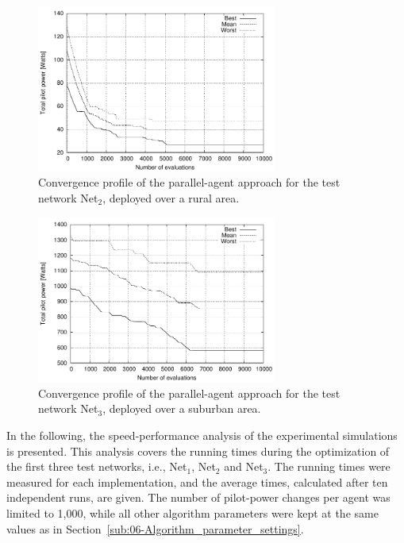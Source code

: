 \begin{figure}[h]
\centering

\includegraphics[width=0.7\textwidth]{06-experimental_evaluation-service_coverage/img/convergence_second}

\caption{Convergence profile of the parallel-agent approach for the test network
Net$_{2}$, deployed over a rural area.\emph{\label{fig:06-Convergence_Net2}}}
\end{figure}


\begin{figure}[h]
\centering

\includegraphics[width=0.7\textwidth]{06-experimental_evaluation-service_coverage/img/convergence_third}

\caption{Convergence profile of the parallel-agent approach for the test network
Net$_{3}$, deployed over a suburban area.\emph{\label{fig:06-Convergence_Net3}}}
\end{figure}


\bigskip{}


In the following, the speed-performance analysis of the experimental
simulations is presented. This analysis covers the running times during
the optimization of the first three test networks, i.e., Net$_{1}$,
Net$_{2}$ and Net$_{3}$. The running times were measured for each
implementation, and the average times, calculated after ten independent
runs, are given. The number of pilot-power changes per agent was limited
to 1,000, while all other algorithm parameters were kept at the same
values as in Section~\ref{sub:06-Algorithm_parameter_settings}.

